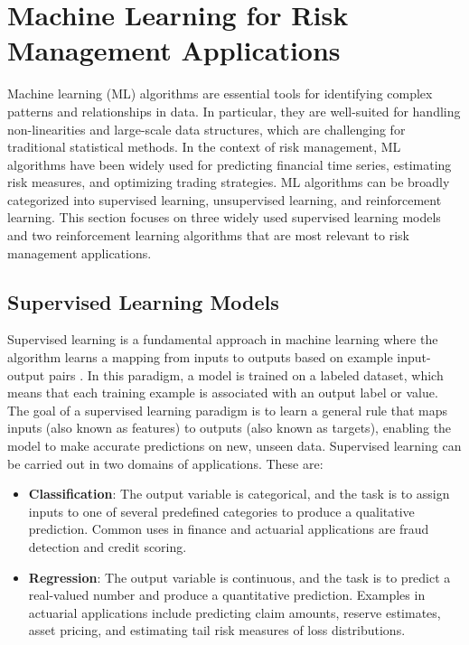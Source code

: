 \section{Machine Learning for Risk Management Applications}

Machine learning (ML) algorithms are essential tools for identifying complex patterns and relationships in data. 
In particular, they are well-suited for handling non-linearities and large-scale data structures, which are challenging for traditional statistical methods. 
In the context of risk management, ML algorithms have been widely used for predicting financial time series, estimating risk measures, and optimizing trading strategies.
ML algorithms can be broadly categorized into supervised learning, unsupervised learning, and reinforcement learning.
This section focuses on three widely used supervised learning models and two reinforcement learning algorithms that are most relevant to risk management applications.

\subsection{Supervised Learning Models}

Supervised learning is a fundamental approach in machine learning where the algorithm learns a mapping from inputs to outputs based on example input-output pairs \cite{galton1886regression}. 
In this paradigm, a model is trained on a labeled dataset, which means that each training example is associated with an output label or value. 
The goal of a supervised learning paradigm is to learn a general rule that maps inputs (also known as features) to outputs (also known as targets), enabling the model to make accurate predictions on new, unseen data.
Supervised learning can be carried out in two domains of applications.
These are:

\begin{itemize} 
    \item \textbf{Classification}: The output variable is categorical, and the task is to assign inputs to one of several predefined categories to produce a qualitative prediction. 
    Common uses in finance and actuarial applications are fraud detection and credit scoring.
    \item \textbf{Regression}: The output variable is continuous, and the task is to predict a real-valued number and produce a quantitative prediction. 
    Examples in actuarial applications include predicting claim amounts, reserve estimates, asset pricing, and estimating tail risk measures of loss distributions.
\end{itemize}


